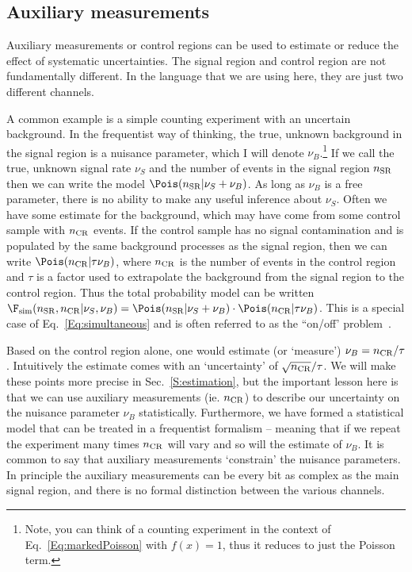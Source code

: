 \subsection{Auxiliary measurements}\label{S:AuxMeas}


Auxiliary measurements or control regions can be used to estimate or reduce the effect of systematic uncertainties.  The signal region and control region are not fundamentally different.  In the language that we are using here, they are just two different channels.  


A common example is  a simple counting experiment with an uncertain background.  In the frequentist way of thinking, the true, unknown background in the signal region is a nuisance parameter, which I will denote $\nu_B$.\footnote{Note, you can think of a counting experiment in the context of Eq.~\ref{Eq:markedPoisson} with $f(x)=1$, thus it reduces to just the Poisson term.}  If we call the true, unknown signal rate $\nu_S$ and the number of events in the signal region $n_{\rm SR}$ then we can write the model $\Pois(n_{\rm SR} | \nu_S + \nu_B)$.  As long as $\nu_B$ is a free parameter, there is no ability to make any useful inference about $\nu_S$.  Often we have some estimate for the background, which may have come from some control sample with $n_{\rm CR}$ events.  If the control sample has no signal contamination and is populated by the same background processes as the signal region, then we can write $\Pois(n_{\rm CR}|\tau \nu_B)$, where $n_{\rm CR}$ is the number of events in the control region and $\tau$ is a factor used to extrapolate the background from the signal region to the control region.  Thus the total probability model can be written $\F_{\rm sim}(n_{\rm SR},n_{\rm CR} | \nu_S, \nu_B) = \Pois(n_{\rm SR} | \nu_S + \nu_B)\cdot \Pois(n_{\rm CR}|\tau\nu_B)$.  This is a special case of Eq.~\ref{Eq:simultaneous} and is often referred to as the ``on/off' problem~\cite{Cousins:2008zz}.


Based on the control region alone, one would estimate (or `measure') $\nu_B = n_{\rm CR}/\tau$.  Intuitively the estimate comes with an  `uncertainty' of $\sqrt{n_{\rm CR}}/\tau$.   We will make these points more precise in Sec.~\ref{S:estimation}, but the important lesson here is that we can use auxiliary measurements (ie. $n_{\rm CR}$) to describe our uncertainty on the nuisance parameter $\nu_B$ statistically.  Furthermore, we have formed a statistical model that can be treated in a frequentist formalism -- meaning that if we repeat the experiment many times $n_{\rm CR}$ will vary and so will the estimate of $\nu_B$.   It is common to say that auxiliary measurements `constrain' the nuisance parameters.  In principle the auxiliary measurements can be every bit as complex as the main signal region, and there is no formal distinction between the various channels.


